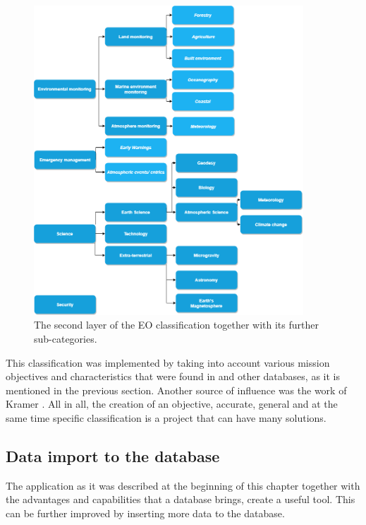 \begin{figure}
\centering
\includegraphics[width=0.9\textwidth]{Images/classification_2nd_layer.png}\caption{The second layer of the EO classification together with its further sub-categories.}
\label{classification_2nd_layer}
\end{figure}

This classification was implemented by taking into account various mission objectives and characteristics that were found in \cite{Newspace} and other databases, as it is mentioned in the previous section. Another source of influence was the work of Kramer \cite{Kramer 2002}. All in all, the creation of an objective, accurate, general and at the same time specific classification is a project that can have many solutions.

\bigskip
\subsection{Data import to the database}
\bigskip

The application as it was described at the beginning of this chapter together with the advantages and capabilities that a database brings, create a useful tool. This can be further improved by inserting more data to the database.

